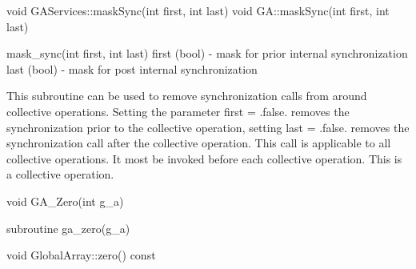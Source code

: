\documentclass[12pt]{article}
\begin{document}
\begin{cxxapi}
\begin{cxxcode}
void GAServices::maskSync(int first, int last)
void GA::maskSync(int first, int last)
\end{cxxcode}
\begin{funcargs}
\end{funcargs}
\end{cxxapi}

\begin{pyapi}
\begin{pycode}
mask_sync(int first, int last)
   first (bool)   - mask for prior internal synchronization
   last (bool)    - mask for post internal synchronization
\end{pycode}
\end{pyapi}
\dcoll
\begin{desc}

This subroutine can be used to remove synchronization calls from around collective
operations. Setting the parameter first = .false. removes the synchronization prior
to the collective operation, setting last = .false. removes the synchronization call
after the collective operation. This call is applicable to all collective operations. 
It most be invoked before each collective operation.
This is a  collective operation.

\end{desc}


\begin{capi}
\begin{ccode}
void GA_Zero(int g_a)
\end{ccode}
\begin{funcargs}
\end{funcargs}
\end{capi}

\begin{fapi}
\begin{fcode}
subroutine ga_zero(g_a)
\end{fcode}
\begin{funcargs}
\end{funcargs}
\end{fapi}

\begin{cxxapi}
\begin{cxxcode}
void GlobalArray::zero() const
\end{cxxcode}
\end{cxxapi}
\end{document}
